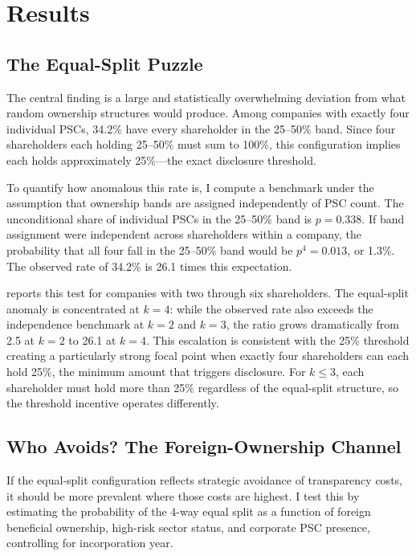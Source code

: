 \documentclass[12pt]{article}
\begin{document}



\section{Results}
\label{sec:results}

\subsection{The Equal-Split Puzzle}

The central finding is a large and statistically overwhelming deviation from what random ownership structures would produce. Among companies with exactly four individual PSCs, 34.2\% have every shareholder in the 25--50\% band. Since four shareholders each holding 25--50\% must sum to 100\%, this configuration implies each holds approximately 25\%---the exact disclosure threshold.

To quantify how anomalous this rate is, I compute a benchmark under the assumption that ownership bands are assigned independently of PSC count. The unconditional share of individual PSCs in the 25--50\% band is $p = 0.338$. If band assignment were independent across shareholders within a company, the probability that all four fall in the 25--50\% band would be $p^4 = 0.013$, or 1.3\%. The observed rate of 34.2\% is 26.1 times this expectation.

 reports this test for companies with two through six shareholders. The equal-split anomaly is concentrated at $k = 4$: while the observed rate also exceeds the independence benchmark at $k = 2$ and $k = 3$, the ratio grows dramatically from 2.5 at $k = 2$ to 26.1 at $k = 4$. This escalation is consistent with the 25\% threshold creating a particularly strong focal point when exactly four shareholders can each hold 25\%, the minimum amount that triggers disclosure. For $k \leq 3$, each shareholder must hold more than 25\% regardless of the equal-split structure, so the threshold incentive operates differently.



\subsection{Who Avoids? The Foreign-Ownership Channel}

If the equal-split configuration reflects strategic avoidance of transparency costs, it should be more prevalent where those costs are highest. I test this by estimating the probability of the 4-way equal split as a function of foreign beneficial ownership, high-risk sector status, and corporate PSC presence, controlling for incorporation year.
\end{document}
